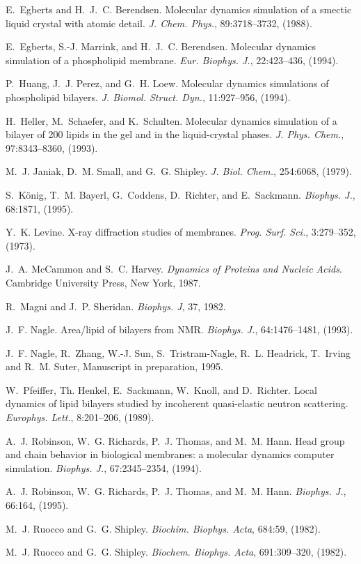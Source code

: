 E.~Egberts and H.~J.~C. Berendsen.
Molecular dynamics simulation of a smectic liquid crystal with atomic
  detail.
{\em J. Chem. Phys.}, 89:3718--3732, (1988).

E.~Egberts, S.-J. Marrink, and H.~J.~C. Berendsen.
Molecular dynamics simulation of a phospholipid membrane.
{\em Eur. Biophys. J.}, 22:423--436, (1994).

P.~Huang, J.~J. Perez, and G.~H. Loew.
Molecular dynamics simulations of phospholipid bilayers.
{\em J. Biomol. Struct. Dyn.}, 11:927--956, (1994).

H.~Heller, M.~Schaefer, and K.~Schulten.
Molecular dynamics simulation of a bilayer of 200 lipids in the gel
  and in the liquid-crystal phases.
{\em J. Phys. Chem.}, 97:8343--8360, (1993).

M.~J. Janiak, D.~M. Small, and G.~G. Shipley.
{\em J. Biol. Chem.}, 254:6068, (1979).

S.~{K\"{o}nig}, T.~M. Bayerl, G.~Coddens, D.~Richter, and E.~Sackmann.
{\em Biophys. J.}, 68:1871, (1995).

Y.~K. Levine.
X-ray diffraction studies of membranes.
{\em Prog. Surf. Sci.}, 3:279--352, (1973).

J.~A. McCammon and S.~C. Harvey.
{\em Dynamics of Proteins and Nucleic Acids}.
Cambridge University Press, New York, 1987.

R.~Magni and J.~P. Sheridan.
{\em Biophys. J}, 37, 1982.

J.~F. Nagle.
Area/lipid of bilayers from {NMR}.
{\em Biophys. J.}, 64:1476--1481, (1993).

J.~F. Nagle, R.~Zhang, W.-J. Sun, S.~Tristram-Nagle, R.~L. Headrick, T.~Irving
and  R.~M.  Suter,
Manuscript in preparation, 1995.

W.~Pfeiffer, Th. Henkel, E.~Sackmann, W.~Knoll, and D.~Richter.
Local dynamics of lipid bilayers studied by incoherent quasi-elastic
  neutron scattering.
{\em Europhys. Lett.}, 8:201--206, (1989).

A.~J. Robinson, W.~G. Richards, P.~J. Thomas, and M.~M. Hann.
Head group and chain behavior in biological membranes: a molecular
  dynamics computer simulation.
{\em Biophys. J.}, 67:2345--2354, (1994).

A.~J. Robinson, W.~G. Richards, P.~J. Thomas, and M.~M. Hann.
{\em Biophys. J.}, 66:164, (1995).

M.~J. Ruocco and G.~G. Shipley.
{\em Biochim. Biophys. Acta}, 684:59, (1982).

M.~J. Ruocco and G.~G. Shipley.
{\em Biochem. Biophys. Acta}, 691:309--320, (1982).

